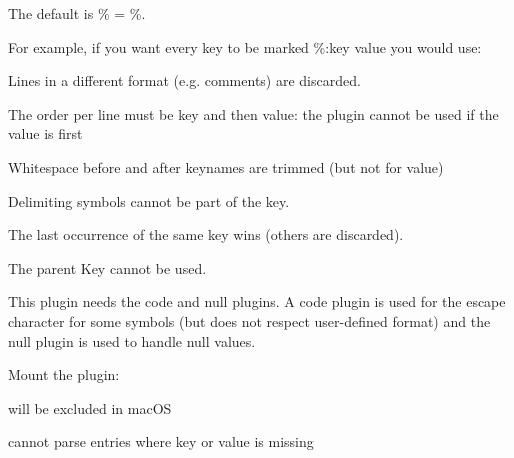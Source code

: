 The default is {\ttfamily \% = \%}.

For example, if you want every key to be marked {\ttfamily \%\+:key value} you would use\+:


\begin{DoxyCode}{0}
\end{DoxyCode}



\begin{DoxyItemize}
\item Lines in a different format (e.\+g. comments) are discarded.
\item The order per line must be key and then value\+: the plugin cannot be used if the value is first
\item Whitespace before and after keynames are trimmed (but not for value)
\item Delimiting symbols cannot be part of the key.
\item The last occurrence of the same key wins (others are discarded).
\item The parent Key cannot be used.
\item This plugin needs the code and null plugins. A code plugin is used for the escape character for some symbols (but does not respect user-\/defined {\ttfamily format}) and the null plugin is used to handle null values.
\end{DoxyItemize}

Mount the plugin\+:


\begin{DoxyCode}{0}
\end{DoxyCode}



\begin{DoxyItemize}
\item will be excluded in mac\+OS
\item cannot parse entries where key or value is missing 
\end{DoxyItemize}